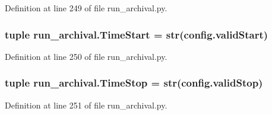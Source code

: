 Definition at line 249 of file run\-\_\-archival.\-py.

\hypertarget{namespacerun__archival_a53d4e2d27208c61f6d716aabecf14cb9}{
\subsubsection[{Time\-Start}]{\setlength{\rightskip}{0pt plus 5cm}tuple run\-\_\-archival.\-Time\-Start = str(config.\-valid\-Start)}}\label{namespacerun__archival_a53d4e2d27208c61f6d716aabecf14cb9}


Definition at line 250 of file run\-\_\-archival.\-py.

\hypertarget{namespacerun__archival_adac2aadd91ae98a0f37065bf28c01999}{
\subsubsection[{Time\-Stop}]{\setlength{\rightskip}{0pt plus 5cm}tuple run\-\_\-archival.\-Time\-Stop = str(config.\-valid\-Stop)}}\label{namespacerun__archival_adac2aadd91ae98a0f37065bf28c01999}


Definition at line 251 of file run\-\_\-archival.\-py.

